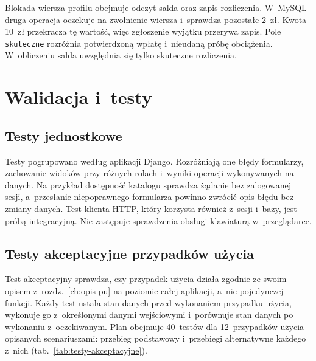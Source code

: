 \documentclass[12pt,a4paper,oneside]{article}
\newcounter{pu}
\begin{document}


Blokada wiersza profilu obejmuje odczyt salda oraz zapis rozliczenia. W~MySQL druga operacja oczekuje na zwolnienie wiersza i~sprawdza pozostałe 2~zł. Kwota 10~zł przekracza tę wartość, więc zgłoszenie wyjątku przerywa zapis. Pole \texttt{skuteczne} rozróżnia potwierdzoną wpłatę i~nieudaną próbę obciążenia. W~obliczeniu salda uwzględnia się tylko skuteczne rozliczenia.


\clearpage
\section{Walidacja i~testy}
\label{ch:testy}

\subsection{Testy jednostkowe}

Testy pogrupowano według aplikacji Django. Rozróżniają one błędy formularzy, zachowanie widoków przy różnych rolach i~wyniki operacji wykonywanych na danych. Na przykład dostępność katalogu sprawdza żądanie bez zalogowanej sesji, a~przesłanie niepoprawnego formularza powinno zwrócić opis błędu bez zmiany danych. Test klienta HTTP, który korzysta również z~sesji i~bazy, jest próbą integracyjną. Nie zastępuje sprawdzenia obsługi klawiaturą w~przeglądarce.


\subsection{Testy akceptacyjne przypadków użycia}
\label{sec:testy-akceptacyjne}

Test akceptacyjny sprawdza, czy przypadek użycia działa zgodnie ze swoim opisem z~rozdz.~\ref{ch:opis-pu} na poziomie całej aplikacji, a~nie pojedynczej funkcji. Każdy test ustala stan danych przed wykonaniem przypadku użycia, wykonuje go z~określonymi danymi wejściowymi i~porównuje stan danych po wykonaniu z~oczekiwanym. Plan obejmuje 40~testów dla 12~przypadków użycia opisanych scenariuszami: przebieg podstawowy i~przebiegi alternatywne każdego z~nich (tab.~\ref{tab:testy-akceptacyjne}).
\end{document}

